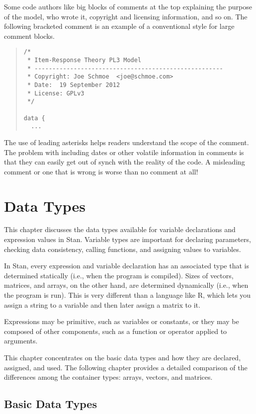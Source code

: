 Some code authors like big blocks of comments at the top explaining
the purpose of the model, who wrote it, copyright and licensing
information, and so on.  The following bracketed comment is an
example of a conventional style for large comment blocks.
%
\begin{quote}
\begin{Verbatim}[fontsize=\small]
/*
 * Item-Response Theory PL3 Model
 * -----------------------------------------------------
 * Copyright: Joe Schmoe  <joe@schmoe.com>
 * Date:  19 September 2012
 * License: GPLv3
 */

data {
  ...
\end{Verbatim}
\end{quote}
%
The use of leading asterisks helps readers understand the scope of the
comment.  The problem with including dates or other volatile
information in comments is that they can easily get out of synch with
the reality of the code.  A misleading comment or one that is wrong is
worse than no comment at all!


\chapter{Data Types}

\noindent
This chapter discusses the data types available for variable
declarations and expression values in Stan.  Variable types are
important for declaring parameters, checking data consistency, calling
functions, and assigning values to variables.

In Stan, every expression and variable declaration has an associated
type that is determined statically (i.e., when the program is
compiled).  Sizes of vectors, matrices, and arrays, on the other hand,
are determined dynamically (i.e., when the program is run).  This is
very different than a language like R, which lets you assign a string
to a variable and then later assign a matrix to it.

Expressions may be primitive, such as variables or constants, or they
may be composed of other components, such as a function or operator
applied to arguments.  

This chapter concentrates on the basic data types and how they are
declared, assigned, and used.  The following chapter provides a
detailed comparison of the differences among the container types:
arrays, vectors, and matrices.

\section{Basic Data Types}

